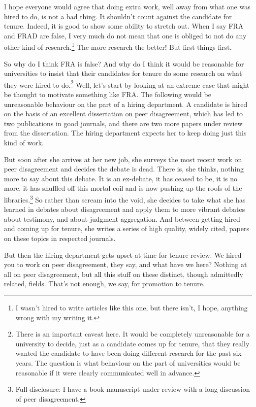 \documentclass[
  11pt,
  letterpaper,
  DIV=11,
  numbers=noendperiod,
  twoside]{scrartcl}
\begin{document}
I hope everyone would agree that doing extra work, well away from what
one was hired to do, is not a bad thing. It shouldn't count against the
candidate for tenure. Indeed, it is good to show some ability to stretch
out. When I say FRA and FRAD are false, I very much do not mean that one
is obliged to not do any other kind of research.\footnote{I wasn't hired
  to write articles like this one, but there isn't, I hope, anything
  wrong with my writing it.} The more research the better! But first
things first.

So why do I think FRA is false? And why do I think it would be
reasonable for universities to insist that their candidates for tenure
do some research on what they were hired to do.\footnote{There is an
  important caveat here. It would be completely unreasonable for a
  university to decide, just as a candidate comes up for tenure, that
  they really wanted the candidate to have been doing different research
  for the past six years. The question is what behaviour on the part of
  universities would be reasonable if it were clearly communicated well
  in advance.} Well, let's start by looking at an extreme case that
might be thought to motivate something like FRA. The following would be
unreasonable behaviour on the part of a hiring department. A candidate
is hired on the basis of an excellent dissertation on peer disagreement,
which has led to two publications in good journals, and there are two
more papers under review from the dissertation. The hiring department
expects her to keep doing just this kind of work.

But soon after she arrives at her new job, she surveys the most recent
work on peer disagreement and decides the debate is dead. There is, she
thinks, nothing more to say about this debate. It is an ex-debate, it
has ceased to be, it is no more, it has shuffled off this mortal coil
and is now pushing up the roofs of the libraries.\footnote{Full
  disclosure: I have a book manuscript under review with a long
  discussion of peer disagreement.} So rather than scream into the void,
she decides to take what she has learned in debates about disagreement
and apply them to more vibrant debates about testimony, and about
judgment aggregation. And between getting hired and coming up for
tenure, she writes a series of high quality, widely cited, papers on
these topics in respected journals.

But then the hiring department gets upset at time for tenure review. We
hired you to work on peer disagreement, they say, and what have we here?
Nothing at all on peer disagreement, but all this stuff on these
distinct, though admittedly related, fields. That's not enough, we say,
for promotion to tenure.
\end{document}
